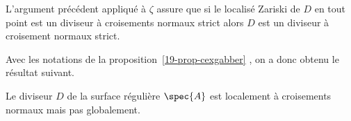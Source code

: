 \documentclass[10pt]{../fichiers-configuration-latex/smfart}
\begin{document}
\begin{remarque} L'argument précédent appliqué à $\zeta$ assure que si le localisé Zariski de $D$ en
tout point est un diviseur à croisements normaux strict alors $D$ est un diviseur à croisement
normaux strict.\end{remarque}

Avec les notations de la proposition~\ref{19-prop-cexgabber} , on a donc obtenu le résultat suivant.

\begin{corollaire}\label{19-dcn} Le diviseur $D$ de la surface régulière $\spec{A}$ est localement à
croisements normaux mais pas globalement.\end{corollaire}

\ifx\danslelivre\undefined


\end{document}
